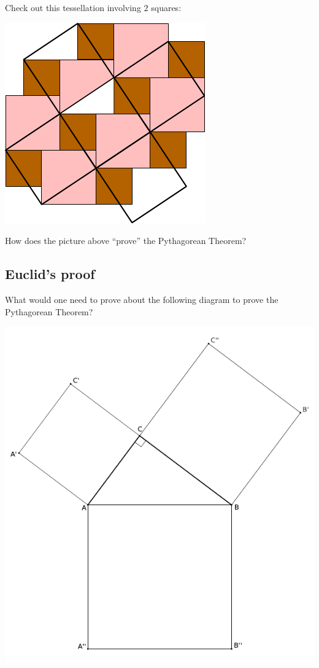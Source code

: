\documentclass{ximera}
\begin{document}
\begin{question}
Check out this tessellation involving $2$ squares:
\begin{image}
\includegraphics{pbppyth2.pdf}
\end{image}
How does the picture above ``prove'' the Pythagorean Theorem?
\end{question}





\subsection*{Euclid's proof}


\begin{question} 
What would one need to prove about the following diagram to prove the
Pythagorean Theorem?
\begin{image}
\includegraphics{PythEuclid.pdf}
\end{image}
\end{question}
\end{document}
